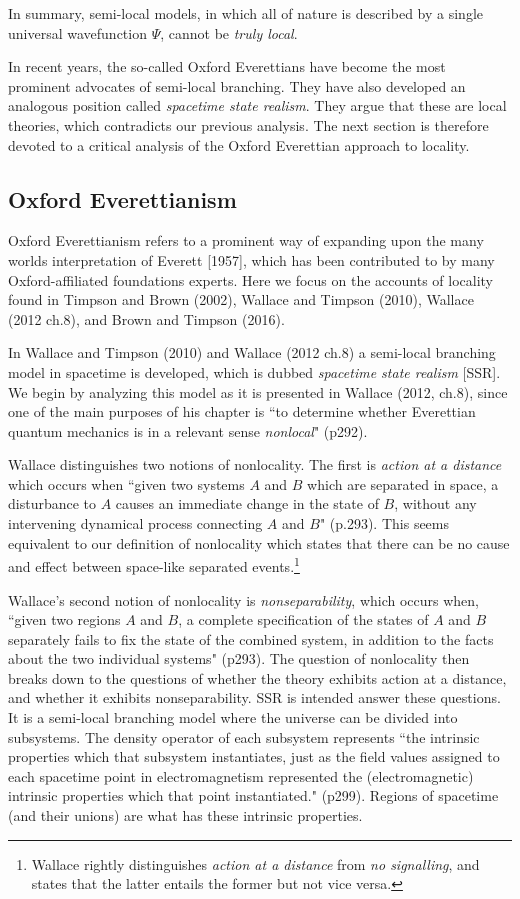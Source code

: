 \documentclass[a4paper]{article}
\begin{document}
In summary, semi-local models, in which all of nature is described by a single universal wavefunction $\Psi$, cannot be \textit{truly local}.

In recent years, the so-called Oxford Everettians have become the most prominent advocates of semi-local branching. They have also developed an analogous position called \textit{spacetime state realism}. They argue that these are local theories, which contradicts our previous analysis. The next section is therefore devoted to a critical analysis of the Oxford Everettian approach to locality. 


\subsection{Oxford Everettianism}\label{Oxford}


Oxford Everettianism refers to a prominent way of expanding upon the many worlds interpretation of Everett [1957], which has been contributed to by many Oxford-affiliated foundations experts. Here we focus on the accounts of locality found in Timpson and Brown (2002), Wallace and Timpson (2010), Wallace (2012 ch.8), and Brown and Timpson (2016).

In Wallace and Timpson (2010) and Wallace (2012 ch.8) a semi-local branching model in spacetime is developed, which is dubbed \textit{spacetime state realism} [SSR]. We begin by analyzing this model as it is presented in Wallace (2012, ch.8), since one of the main purposes of his chapter is ``to determine whether Everettian quantum mechanics is in a relevant sense \textit{nonlocal}" (p292). 

Wallace distinguishes two notions of nonlocality. The first is  \textit{action at a distance} which occurs when ``given two systems $A$ and $B$ which are separated in space, a disturbance to $A$ causes an immediate change in the state of $B$, without any intervening dynamical process connecting $A$ and $B$" (p.293). This seems equivalent to our definition of nonlocality which states that there can be no cause and effect between space-like separated events.\footnote{Wallace rightly distinguishes \textit{action at a distance} from \textit{no signalling}, and states that the latter entails the former but not vice versa.}


Wallace's second notion of nonlocality is \textit{nonseparability}, which occurs when, ``given two regions $A$ and $B$, a complete specification of the states of $A$ and $B$ separately fails to fix the state of the combined system, in addition to the facts about the two individual systems" (p293). The question of nonlocality then breaks down to the questions of whether the theory exhibits action at a distance, and whether it exhibits nonseparability. 
SSR is intended answer these questions. It is a semi-local branching model where the universe can be divided into subsystems. The density operator of each subsystem represents ``the intrinsic properties which that subsystem instantiates, just as the field values assigned to each spacetime point in electromagnetism represented the (electromagnetic) intrinsic properties which that point instantiated." (p299). Regions of spacetime (and their unions) are what has these intrinsic properties.
\end{document}
